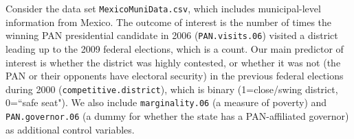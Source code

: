 \documentclass[12pt,letterpaper]{article}
\begin{document}
\noindent Consider the data set \texttt{MexicoMuniData.csv}, which includes municipal-level information from Mexico. The outcome of interest is the number of times the winning PAN presidential candidate in 2006 (\texttt{PAN.visits.06}) visited a district leading up to the 2009 federal elections, which is a count. Our main predictor of interest is whether the district was highly contested, or whether it was not (the PAN or their opponents have electoral security) in the previous federal elections during 2000 (\texttt{competitive.district}), which is binary (1=close/swing district, 0=``safe seat"). We also include \texttt{marginality.06} (a measure of poverty) and \texttt{PAN.governor.06} (a dummy for whether the state has a PAN-affiliated governor) as additional control variables. 

\end{document}
